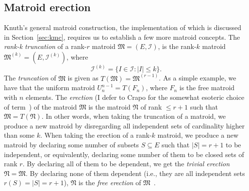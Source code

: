 \subsection{Matroid erection}
Knuth's general matroid construction, the implementation of which is discussed in Section~\ref{sec:kmc}, requires us to establish a few more matroid concepts. The \textit{rank-k truncation} of a rank-$r$ matroid $\mathfrak{M} = (E, \mathcal{I})$, is the rank-$k$ matroid $\mathfrak{M}^{(k)} = (E, \mathcal{I}^{(k)})$, where
$$\mathcal{I}^{(k)} = \{ I \in \mathcal{I} : |I| \leq k \}.$$
The \textit{truncation} of $\mathfrak{M}$ is given as $T(\mathfrak{M}) = \mathfrak{M}^{(r-1)}$. As a simple example, we have that the uniform matroid $U_n^{n-1} = T(F_n)$, where $F_n$ is the free matroid with $n$ elements. The \textit{erection} (I defer to Crapo for the somewhat esoteric choice of term~\cite{Crapo1970}) of the matroid $\mathfrak{M}$ is the matroid $\mathfrak{N}$ of rank $\leq r+1$ such that $\mathfrak{M} = T(\mathfrak{N})$. In other words, when taking the truncation of a matroid, we produce a new matroid by disregarding all independent sets of cardinality higher than some $k$. When taking the erection of a rank-$k$ matroid, we produce a new matroid by declaring some number of subsets $S \subseteq E$ such that $|S|=r+1$ to be independent, or equivalently, declaring some number of them to be closed sets of rank $r$. By declaring all of them to be dependent, we get the \textit{trivial erection} $\mathfrak{N} = \mathfrak{M}$. By declaring none of them dependent (i.e., they are all independent sets $r(S) = |S| = r+1$), $\mathfrak{N}$ is the \textit{free erection} of $\mathfrak{M}$~\cite{greene-1991}.

